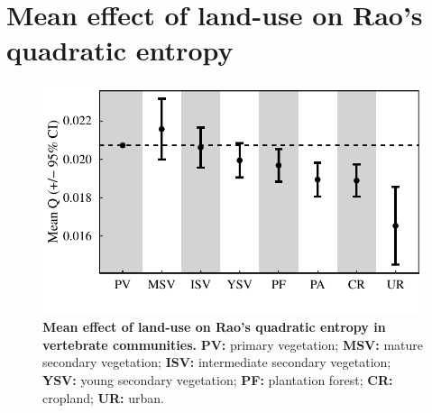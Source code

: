 \documentclass[11pt]{article}
\begin{document}
\section{Mean effect of land-use on Rao's quadratic entropy}
\begin{figure}[h!]
\centering
\includegraphics[scale=0.70]{figures/Mean_effect_RAOQ}
\caption[Mean effect of land-use on Rao's quadratic entropy in vertebrate communities]{\textbf{Mean effect of land-use on Rao's quadratic entropy in vertebrate communities.} \textbf{PV:} primary vegetation; \textbf{MSV:} mature secondary vegetation; \textbf{ISV:} intermediate secondary vegetation; \textbf{YSV:} young secondary vegetation; \textbf{PF:} plantation forest; \textbf{CR:} cropland; \textbf{UR:} urban.}
\label{LU_mean_RaoQ}
\end{figure}
\end{document}
